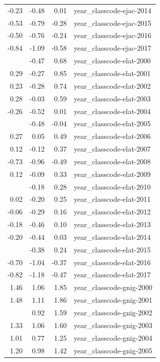 \documentclass[]{article}
\begin{document}
\begin{longtable}[t]{rrrl}
-0.23 & -0.48 & 0.01 & year\_classcode-ejac-2014\\
-0.53 & -0.79 & -0.28 & year\_classcode-ejac-2015\\
-0.50 & -0.76 & -0.24 & year\_classcode-ejac-2016\\
-0.84 & -1.09 & -0.58 & year\_classcode-ejac-2017\\
\addlinespace
0.11 & -0.47 & 0.68 & year\_classcode-elat-2000\\
0.29 & -0.27 & 0.85 & year\_classcode-elat-2001\\
0.23 & -0.28 & 0.74 & year\_classcode-elat-2002\\
0.28 & -0.03 & 0.59 & year\_classcode-elat-2003\\
-0.26 & -0.52 & 0.01 & year\_classcode-elat-2004\\
\addlinespace
-0.26 & -0.48 & -0.04 & year\_classcode-elat-2005\\
0.27 & 0.05 & 0.49 & year\_classcode-elat-2006\\
0.12 & -0.12 & 0.37 & year\_classcode-elat-2007\\
-0.73 & -0.96 & -0.49 & year\_classcode-elat-2008\\
0.12 & -0.09 & 0.33 & year\_classcode-elat-2009\\
\addlinespace
0.05 & -0.18 & 0.28 & year\_classcode-elat-2010\\
0.02 & -0.20 & 0.25 & year\_classcode-elat-2011\\
-0.06 & -0.29 & 0.16 & year\_classcode-elat-2012\\
-0.18 & -0.46 & 0.10 & year\_classcode-elat-2013\\
-0.20 & -0.44 & 0.03 & year\_classcode-elat-2014\\
\addlinespace
-0.07 & -0.38 & 0.24 & year\_classcode-elat-2015\\
-0.70 & -1.04 & -0.37 & year\_classcode-elat-2016\\
-0.82 & -1.18 & -0.47 & year\_classcode-elat-2017\\
1.46 & 1.06 & 1.85 & year\_classcode-gnig-2000\\
1.48 & 1.11 & 1.86 & year\_classcode-gnig-2001\\
\addlinespace
1.25 & 0.92 & 1.59 & year\_classcode-gnig-2002\\
1.33 & 1.06 & 1.60 & year\_classcode-gnig-2003\\
1.01 & 0.77 & 1.25 & year\_classcode-gnig-2004\\
1.20 & 0.98 & 1.42 & year\_classcode-gnig-2005\\

\end{longtable}
\end{document}
